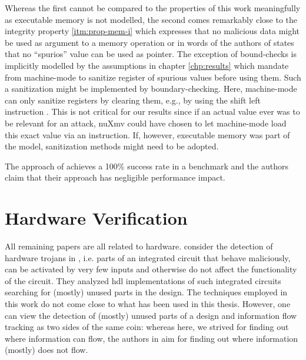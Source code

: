 Whereas the first cannot be compared to the properties of this work meaningfully as executable memory is not modelled, the second comes remarkably close to the integrity property \ref{itm:prop-mem-i} which expresses that no malicious data might be used as argument to a memory operation or in words of the authors of \cite{SuhLZD04} states that no \enquote{spurios} value can be used as pointer.
The exception of bound-checks is implicitly modelled by the  assumptions in chapter \ref{chp:results} which mandate from machine-mode to sanitize register of spurious values before using them.
Such a sanitization might be implemented by boundary-checking.
Here, machine-mode can only sanitize registers by clearing them, e.g., by using the shift left instruction .
This is not critical for our results since if an actual value ever was to be relevant for an attack, nuXmv could have chosen to let machine-mode load this exact value via an  instruction.
If, however, executable memory was part of the model, sanitization methods might need to be adopted.

The approach of \cite{SuhLZD04} achieves a 100\% success rate in a benchmark and the authors claim that their approach has negligible performance impact.

\section{Hardware Verification}

All remaining papers are all related to hardware.
\citeauthor{Zhang15} consider the detection of hardware trojans in  \cite{Zhang15}, i.e. parts of an integrated circuit that behave maliciously, can be activated by very few inputs and otherwise do not affect the functionality of the circuit.
They analyzed \gls{hdl} implementations of such integrated circuits searching for (mostly) unused parts in the design.
The techniques employed in this work do not come close to what has been used in this thesis.
However, one can view the detection of (mostly) unused parts of a design and information flow tracking as two sides of the same coin: whereas here, we strived for finding out where information can flow, the authors in \cite{Zhang15} aim for finding out where information (mostly) does not flow.


